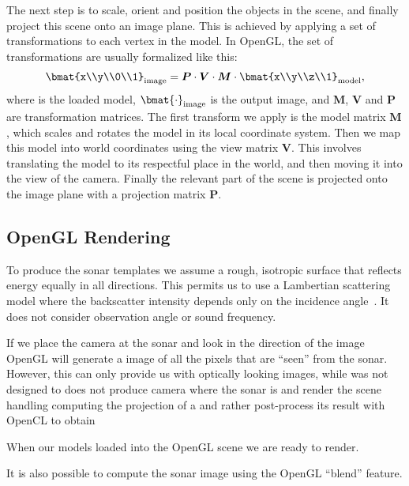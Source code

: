 \documentclass[
   UAM                                          %
 , 12pt                                         %
 , bibtex                                       %
 , layout
]{common/mytemplate}
\newcommand\mat[1]{\boldsymbol{#1}}
\renewcommand*\P{\mat P}
\newcommand*\V{\mat V}
\newcommand*\M{\mat M}
\begin{document}
The next step is to scale, orient and position the objects in the scene, and finally project this scene onto an image plane. This is achieved by applying a set of transformations to each vertex in the model. In OpenGL, the set of transformations are usually formalized like this:
\begin{align*}
\bmat{x\\y\\0\\1}_\text{image} = \P \cdot \V \cdot \M \cdot \bmat{x\\y\\z\\1}_\text{model},
\end{align*}
where is the loaded model, $\bmat{\cdot}_\text{image}$ is the output image, and $\M$, $\V$ and $\P$ are transformation matrices. The first transform we apply is the model matrix $\M$, which scales and rotates the model in its local coordinate system. Then we map this model into world coordinates using the view matrix $\V$. This involves translating the model to its respectful place in the world, and then moving it into the view of the camera. Finally the relevant part of the scene is projected onto the image plane with a projection matrix $\P$. 

\subsection{OpenGL Rendering}

To produce the sonar templates we assume a rough, isotropic surface that reflects energy equally in all directions. This permits us to use a Lambertian scattering model where the backscatter intensity depends only on the incidence angle~\cite{Zhang1999}. It does not consider observation angle or sound frequency.   

If we place the camera at the sonar and look in the direction of the image OpenGL will generate a image of all the pixels that are ``seen'' from the sonar. However, this can only provide us with optically looking images, while was not designed to does not produce camera where the sonar is and render the scene   handling computing the projection of a  and rather post-process its result with OpenCL to obtain 


When our models loaded into the OpenGL scene we are ready to render. 



It is also possible to compute the sonar image using the OpenGL ``blend'' feature.
\end{document}
